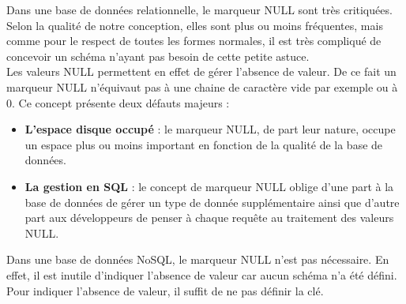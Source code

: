  Dans une base de données relationnelle, le marqueur NULL sont très critiquées. Selon la qualité de notre conception, elles sont plus ou moins fréquentes, mais comme pour le respect de toutes les formes normales, il est très compliqué de concevoir un schéma n'ayant pas besoin de cette petite astuce.\\

  Les valeurs NULL permettent en effet de gérer l'absence de valeur. De ce fait un marqueur NULL n'équivaut pas à une chaine de caractère vide par exemple ou à 0. Ce concept présente deux défauts majeurs :
\vspace{10px}
\begin{itemize}
  \item \textbf{L'espace disque occupé} : le marqueur NULL, de part leur nature, occupe un espace plus ou moins important en fonction de la qualité de la base de données.
  \item \textbf{La gestion en SQL} : le concept de marqueur NULL oblige d'une part à la base de données de gérer un type de donnée supplémentaire ainsi que d'autre part aux développeurs de penser à chaque requête au traitement des valeurs NULL.
\end{itemize}
\vspace{20px}

  Dans une base de données NoSQL, le marqueur NULL n'est pas nécessaire. En effet, il est inutile d'indiquer l'absence de valeur car aucun schéma n'a été défini. Pour indiquer l'absence de valeur, il suffit de ne pas définir la clé.
